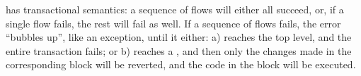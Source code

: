 \documentclass[nonacm, dvipsnames, sigconf]{acmart}
\begin{document}
\langName has transactional semantics: a sequence of flows will either all succeed, or, if a single flow fails, the rest will fail as well.
If a sequence of flows fails, the error ``bubbles up'', like an exception, until it either: a) reaches the top level, and the entire transaction fails; or b) reaches a , and then only the changes made in the corresponding  block will be reverted, and the code in the  block will be executed.



\end{document}
